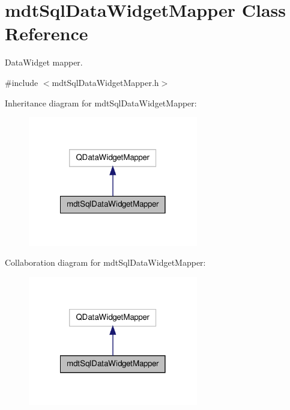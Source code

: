 \hypertarget{classmdt_sql_data_widget_mapper}{\section{mdt\-Sql\-Data\-Widget\-Mapper Class Reference}
\label{classmdt_sql_data_widget_mapper}
}


Data\-Widget mapper.  




{\ttfamily \#include $<$mdt\-Sql\-Data\-Widget\-Mapper.\-h$>$}



Inheritance diagram for mdt\-Sql\-Data\-Widget\-Mapper\-:
\nopagebreak
\begin{figure}[H]
\begin{center}
\leavevmode
\includegraphics[width=210pt]{classmdt_sql_data_widget_mapper__inherit__graph}
\end{center}
\end{figure}


Collaboration diagram for mdt\-Sql\-Data\-Widget\-Mapper\-:
\nopagebreak
\begin{figure}[H]
\begin{center}
\leavevmode
\includegraphics[width=210pt]{classmdt_sql_data_widget_mapper__coll__graph}
\end{center}
\end{figure}
